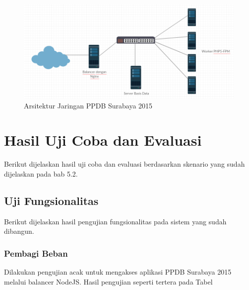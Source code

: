 \documentclass{ta-its}
\begin{document}
				\begin{figure}[h] %
					\centering
					\includegraphics[width=\linewidth]{contoh_img/arsitekturppdb}
					\caption{Arsitektur Jaringan PPDB Surabaya 2015}
					\label{gambarArsitekturPPDB}
				\end{figure}
		
		\section{Hasil Uji Coba dan Evaluasi}
			Berikut dijelaskan hasil uji coba dan evaluasi berdasarkan skenario yang sudah dijelaskan pada bab 5.2.
			
			\subsection{Uji Fungsionalitas}
				Berikut dijelaskan hasil pengujian fungsionalitas pada sistem yang sudah dibangun.
				
				\subsubsection{Pembagi Beban}
					Dilakukan pengujian acak untuk mengakses aplikasi PPDB Surabaya 2015 melalui balancer NodeJS. Hasil pengujian seperti tertera pada Tabel
					
\end{document}
